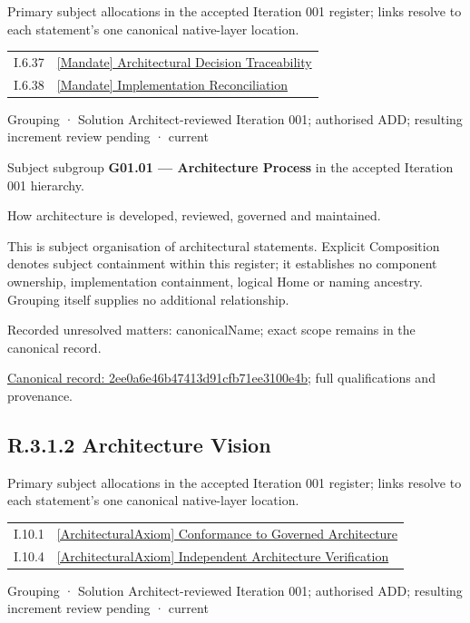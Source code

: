 Primary subject allocations in the accepted Iteration 001 register; links resolve to each statement’s one canonical native-layer location.\par
\begin{longtable}{p{.22\linewidth}p{.73\linewidth}}
I.6.37 & \hyperref[element:ae28fe841f6b476da4393c5e3c6a2eab]{[Mandate] Architectural Decision Traceability} \\
I.6.38 & \hyperref[element:5acccfa8cf634669a26bb31010926720]{[Mandate] Implementation Reconciliation} \\
\end{longtable}
\label{element:2ee0a6e46b47413d91cfb71ee3100e4b}
{\small Grouping · Solution Architect-reviewed Iteration 001; authorised ADD; resulting increment review pending · current}\par

Subject subgroup \textbf{G01.01 — Architecture Process} in the accepted Iteration 001 hierarchy.



How architecture is developed, reviewed, governed and maintained.



This is subject organisation of architectural statements. Explicit Composition denotes subject containment within this register; it establishes no component ownership, implementation containment, logical Home or naming ancestry. Grouping itself supplies no additional relationship.


{\small Recorded unresolved matters: canonicalName; exact scope remains in the canonical record.}\par
{\footnotesize \href{../../../../continuum/grouping/2ee0a6e46b47413d91cfb71ee3100e4b.md}{Canonical record: 2ee0a6e46b47413d91cfb71ee3100e4b}; full qualifications and provenance.}\par
\subsection*{R.3.1.2 Architecture Vision}
\label{navigation:R.3.1.2}

Primary subject allocations in the accepted Iteration 001 register; links resolve to each statement’s one canonical native-layer location.\par
\begin{longtable}{p{.22\linewidth}p{.73\linewidth}}
I.10.1 & \hyperref[element:45eb197073df406ea4080f9665ca12ab]{[ArchitecturalAxiom] Conformance to Governed Architecture} \\
I.10.4 & \hyperref[element:82d29abf230d478aaf42ecb73ecbd01e]{[ArchitecturalAxiom] Independent Architecture Verification} \\
\end{longtable}
\label{element:6d6086134162468cac129040a139d8d9}
{\small Grouping · Solution Architect-reviewed Iteration 001; authorised ADD; resulting increment review pending · current}\par

